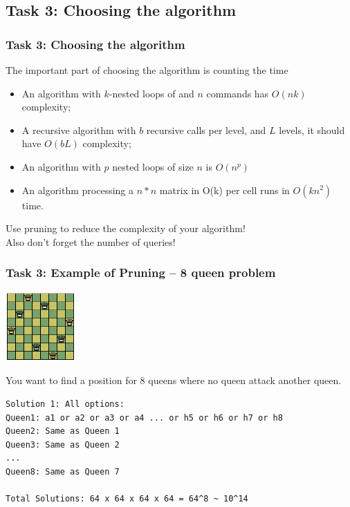 \documentclass{beamer}
\begin{document}
\subsection{Task 3: Choosing the algorithm}


\begin{frame}
  \frametitle{Task 3: Choosing the algorithm}
  The important part of choosing the algorithm is \alert{counting the time}
  \bigskip

  \begin{itemize}
    \item An algorithm with $k$-nested loops of and $n$ commands
      has $O(nk)$ complexity;
    \item A recursive algorithm with $b$ recursive calls per level, and $L$
      levels, it should have $O(bL)$ complexity;
    \item An algorithm with $p$ nested loops of size $n$ is $O(n^p)$
    \item An algorithm processing a $n*n$ matrix in O(k) per cell runs
      in $O(kn^2)$ time.
  \end{itemize}

  \bigskip

  Use \alert{pruning} to reduce the complexity of your algorithm!\\
  Also don't forget the number of queries!
\end{frame}

\begin{frame}[fragile]
  \frametitle{Task 3: Example of Pruning -- 8 queen problem}

  \hfill \includegraphics[width=0.2\textwidth]{../img/8queen}

  You want to find a position for 8 queens where no queen attack another queen.

  \bigskip

\begin{verbatim}
Solution 1: All options:
Queen1: a1 or a2 or a3 or a4 ... or h5 or h6 or h7 or h8
Queen2: Same as Queen 1
Queen3: Same as Queen 2
...
Queen8: Same as Queen 7

Total Solutions: 64 x 64 x 64 x 64 = 64^8 ~ 10^14
\end{verbatim}
\end{frame}
\end{document}
